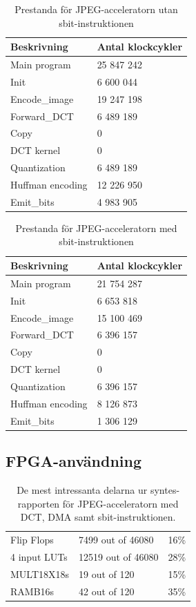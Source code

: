 \documentclass[a4paper]{article}
\begin{document}
\begin{table}[ht]
    \centering
    \begin{tabular}{l l}
        Beskrivning & Antal klockcykler\\
        \hline
        Main program  & 25 847 242 \\
        Init  &  6 600 044 \\
        Encode\_image  & 19 247 198 \\
        Forward\_DCT  & 6 489 189 \\
        Copy  & 0 \\
        DCT kernel  & 0 \\
        Quantization  & 6 489 189 \\
        Huffman encoding  & 12 226 950 \\
        Emit\_bits  &  4 983 905 \\
    \end{tabular}
    \caption{ Prestanda för JPEG-acceleratorn utan sbit-instruktionen }
    \label{tab:jpeg_sw_performance}
\end{table}

\begin{table}[ht]
    \centering
    \begin{tabular}{l l}
        Beskrivning & Antal klockcykler\\
        \hline
        Main program  & 21 754 287 \\
        Init  & 6 653 818 \\
        Encode\_image  & 15 100 469 \\
        Forward\_DCT  & 6 396 157 \\
        Copy  & 0 \\
        DCT kernel  & 0 \\
        Quantization  & 6 396 157 \\
        Huffman encoding  & 8 126 873 \\
        Emit\_bits  & 1 306 129 \\
    \end{tabular}
    \caption{ Prestanda för JPEG-acceleratorn med sbit-instruktionen }
    \label{tab:jpeg_sbit_performance}
\end{table}

\subsection{FPGA-användning}
\begin{table}[ht]
    \centering
    \begin{tabular}{l l l}
        Flip Flops   &      7499 out of   46080  & 16\% \\
        4 input LUTs &      12519 out of  46080  & 28\% \\
        MULT18X18s   &      19 out of 120  &   15\% \\
        RAMB16s      &      42 out of 120  &   35\% \\
    \end{tabular}
    \caption{ De mest intressanta delarna ur syntes-rapporten för
              JPEG-acceleratorn med DCT, DMA samt sbit-instruktionen. }
    \label{tab:fpga_usage}
\end{table}
\end{document}
